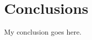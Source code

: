 \documentclass[herrin-thesis.tex]{subfiles}
\begin{document}
\chapter{Conclusions}
\label{ch:conclusion}

My conclusion goes here.
\end{document}

